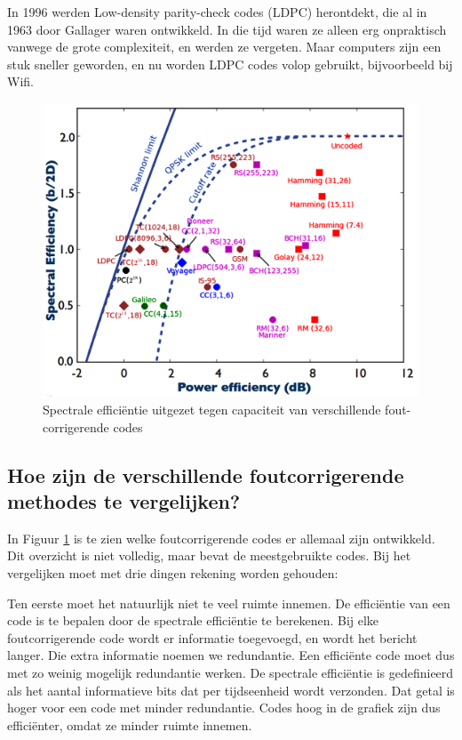 \documentclass[a4paper]{article}
\begin{document}
In 1996 werden Low-density parity-check codes (LDPC) herontdekt, die al in 1963 door Gallager waren ontwikkeld. In die tijd waren ze alleen erg onpraktisch vanwege de grote complexiteit, en werden ze vergeten. Maar computers zijn een stuk sneller geworden, en nu worden LDPC codes volop gebruikt, bijvoorbeeld bij Wifi.

\begin{figure}[!htbp]
\centering
\includegraphics[width=0.7\linewidth]{vergelijking3.png}
\caption[Spectrale efficiëntie uitgezet tegen capaciteit van verschillende fout-corrigerende codes]{Spectrale efficiëntie uitgezet tegen capaciteit van verschillende fout-corrigerende codes\footnotemark}
\label{fig:vergelijking}
\end{figure}


\subsection{Hoe zijn de verschillende foutcorrigerende methodes te vergelijken?}
In Figuur \ref{fig:vergelijking} is te zien welke foutcorrigerende codes er allemaal zijn ontwikkeld. Dit overzicht is niet volledig, maar bevat de meestgebruikte codes. Bij het vergelijken moet met drie dingen rekening worden gehouden:

Ten eerste moet het natuurlijk niet te veel ruimte innemen. De efficiëntie van een code is te bepalen door de spectrale efficiëntie te berekenen. Bij elke foutcorrigerende code wordt er informatie toegevoegd, en wordt het bericht langer. Die extra informatie noemen we redundantie. Een efficiënte code moet dus met zo weinig mogelijk redundantie werken. De spectrale efficiëntie is gedefinieerd als het aantal informatieve bits dat per tijdseenheid wordt verzonden. Dat getal is hoger voor een code met minder redundantie. Codes hoog in de grafiek zijn dus efficiënter, omdat ze minder ruimte innemen.
\end{document}
